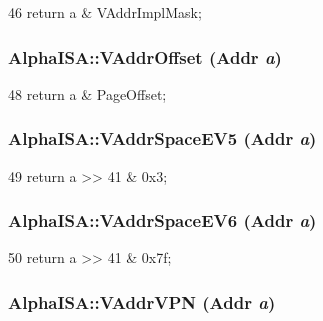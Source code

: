 \begin{DoxyCode}
46 { return a & VAddrImplMask; }
\end{DoxyCode}
\hypertarget{namespaceAlphaISA_a8ef9303074541727ee9a1fdb7fa29c69}{
\subsubsection[{VAddrOffset}]{ AlphaISA::VAddrOffset ({\bf Addr} {\em a})}}
\label{namespaceAlphaISA_a8ef9303074541727ee9a1fdb7fa29c69}



\begin{DoxyCode}
48 { return a & PageOffset; }
\end{DoxyCode}
\hypertarget{namespaceAlphaISA_ac33810d23de17bbfa808c6b9e4e35887}{
\subsubsection[{VAddrSpaceEV5}]{ AlphaISA::VAddrSpaceEV5 ({\bf Addr} {\em a})}}
\label{namespaceAlphaISA_ac33810d23de17bbfa808c6b9e4e35887}



\begin{DoxyCode}
49 { return a >> 41 & 0x3; }
\end{DoxyCode}
\hypertarget{namespaceAlphaISA_a9959ff43372ace452f37b2e12552484d}{
\subsubsection[{VAddrSpaceEV6}]{ AlphaISA::VAddrSpaceEV6 ({\bf Addr} {\em a})}}
\label{namespaceAlphaISA_a9959ff43372ace452f37b2e12552484d}



\begin{DoxyCode}
50 { return a >> 41 & 0x7f; }
\end{DoxyCode}
\hypertarget{namespaceAlphaISA_a6ffa81e21e2eb5e447ece4abf6a70d78}{
\subsubsection[{VAddrVPN}]{ AlphaISA::VAddrVPN ({\bf Addr} {\em a})}}
\label{namespaceAlphaISA_a6ffa81e21e2eb5e447ece4abf6a70d78}



